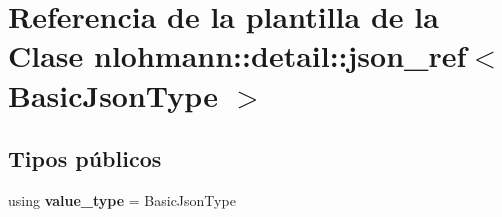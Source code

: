\hypertarget{classnlohmann_1_1detail_1_1json__ref}{}\section{Referencia de la plantilla de la Clase nlohmann\+:\+:detail\+:\+:json\+\_\+ref$<$ Basic\+Json\+Type $>$}
\label{classnlohmann_1_1detail_1_1json__ref}
\subsection*{Tipos públicos}
\begin{DoxyCompactItemize}
\item 
\mbox{\label{classnlohmann_1_1detail_1_1json__ref_a78d76cf288141049568c0d670ed670ef}} 
using {\bfseries value\+\_\+type} = Basic\+Json\+Type
\end{DoxyCompactItemize}
